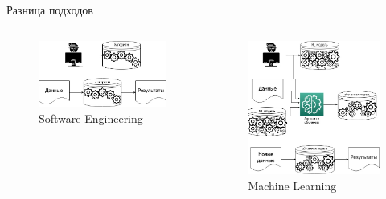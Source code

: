 \documentclass[aspectratio=169]{beamer}
\begin{document}
\begin{frame}{Разница подходов}
    \begin{columns}[T]
        \begin{column}{.44\linewidth}
            \begin{figure}
                \caption*{Software Engineering}
                \includegraphics[width=\linewidth]{graphs/fig16_0.jpg}
            \end{figure}
        \end{column}
        \pause{}
        \begin{column}{.54\linewidth}
            \begin{figure}
                \caption*{Machine Learning}
                \includegraphics[width=.68\linewidth]{graphs/fig16_1.jpg}
            \end{figure}
        \end{column}
    \end{columns}
\end{frame}
\end{document}
